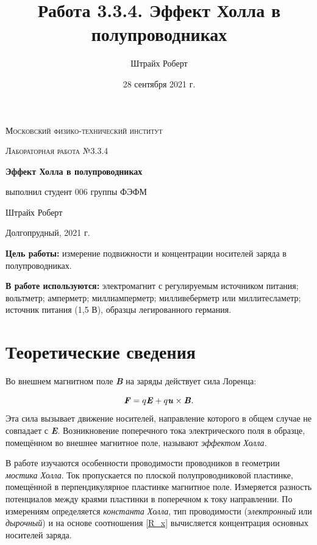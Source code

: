 \documentclass[a4paper, 12pt]{article}
\author{Штрайх Роберт}
\title{Работа 3.3.4. Эффект Холла в полупроводниках}
\date{28 сентября 2021 г.}
\begin{document}
\begin{titlepage}
	\centering
	\vspace{5cm}
	{\scshape\LARGE Московский физико-технический институт \par}
	\vspace{4cm}
	{\scshape\Large Лабораторная работа №3.3.4 \par}
	\vspace{1cm}
	{\huge\bfseries Эффект Холла в полупроводниках \par}
	\vspace{1cm}
	\vfill
\begin{flushright}
	{\Large выполнил студент 006 группы ФЭФМ}\par
	\vspace{0.3cm}
	{\Large Штрайх Роберт}
\end{flushright}
	

	\vfill

	Долгопрудный, 2021 г.
\end{titlepage}

\newpage
\textbf{Цель работы:} измерение подвижности и концентрации носителей заряда в полупроводниках.

\textbf{В работе используются:} электромагнит с регулируемым источником питания; вольтметр; амперметр; миллиамперметр; милливеберметр или миллитесламетр; источник питания (1,5 В), образцы легированного германия.

\section{Теоретические сведения}

Во внешнем магнитном поле \textbf{\textit{B}} на заряды действует сила Лоренца:

\begin{equation} \label{Lorens}
\textbf{\textit{F}} = q\textbf{\textit{E}} + q\textbf{\textit{u}} \times \textbf{\textit{B}}.
\end{equation}
Эта сила вызывает движение носителей, направление которого в общем случае не совпадает с \textbf{\textit{E}}. Возникновение поперечного тока электрического поля в образце, помещённом во внешнее магнитное поле, называют \textit{эффектом Холла.}

В работе изучаются особенности проводимости проводников в геометрии \textit{мостика Холла}. Ток пропускается по плоской полупроводниковой пластинке, помещённой в перпендикулярное пластинке магнитное поле. Измеряется разность потенциалов между краями пластинки в поперечном к току направлении. По измерениям определяется \textit{константа Холла}, тип проводимости (\textit{электронный} или \textit{дырочный}) и на основе соотношения \eqref{R_x} вычисляется концентрация основных носителей заряда.
\end{document}
